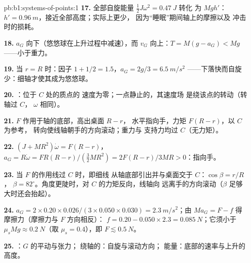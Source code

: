 \begin{solution}{pb:b1:systems-of-points:1}
\textbf{17.} 全部自旋能量 $\tfrac12 J\omega^2 = \qty{0.47}{J}$ 转化
为 $Mgh'$：$h' = \qty{0.96}{m}$，接近全部高度；实际上更少，
因为“睡眠”期间轴上的摩擦以及
冲击时的损耗。

\textbf{18.} $a_G$ 向下（悠悠球在上升过程中减速），而
$v_G$ 向上：$T = M(g - a_G) < Mg$——小于重力。

\textbf{19.} 当 $r = R$ 时：因子 $1 + 1/2 = 1.5$，$a_G = 2g/3 = \qty{6.5}{m/s^2}$
——下落快而自旋少：细轴才使其成为悠悠球。

\textbf{20.} ：位于 $C$ 处的质点的
速度为零；一点静止的，其速度场
是绕该点的转动（转轴过 $C$， $\omega$ 相同）。

\textbf{21.} $F$ 作用于轴的底部，高出桌面 $R - r$，
水平指向手，力矩 $F(R - r)$，以 $C$ 为参考，
转向使线轴朝手的方向滚动；重力与
支持力均过 $C$（无力矩）。

\textbf{22.} $(J + MR^2)\dot\omega = F(R - r)$，$a_G = R\dot\omega = FR(R - r)/
(\tfrac32 MR^2) = 2F(R - r)/3MR > 0$：指向手。

\textbf{23.} 当 $F$ 的作用线过 $C$ 时，即细线
从轴底部引出并与桌面交于 $C$：$\cos\beta = r/R$，
$\beta = 82^\circ$。角度更陡时，对 $C$ 的力矩反向，线轴向
远离手的方向滚动（$\beta$ 足够大时还会抬起）。

\textbf{24.} $a_G = 2 \times 0.20 \times 0.026/(3 \times 0.050 \times 0.030) =
\qty{2.3}{m/s^2}$；由 $Ma_G = F - f$ 得摩擦力（摩擦力与 $F$ 方向相反）：
$f = 0.20 - 0.050 \times 2.3 = \qty{0.085}{N}$；它须小于 $\mu_sMg
\approx \qty{0.2}{N}$（取 $\mu_s = 0.4$），即 $F \lesssim \qty{0.5}{N}$。

\textbf{25.} ：$G$ 的平动与张力；
绕轴的：自旋与滚动方向；
能量：底部的速率与上升的高度。
\end{solution}
